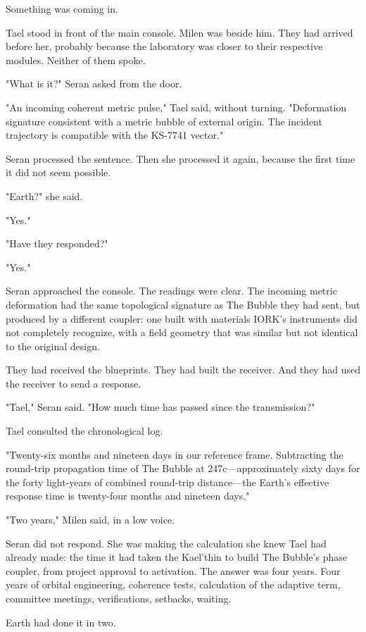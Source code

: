 \documentclass[11pt,a5paper,twoside]{book}
\begin{document}
Something was coming in.

Tael stood in front of the main console. Milen was beside him. They had arrived before her, probably because the laboratory was closer to their respective modules. Neither of them spoke.

"What is it?" Seran asked from the door.

"An incoming coherent metric pulse," Tael said, without turning. "Deformation signature consistent with a metric bubble of external origin. The incident trajectory is compatible with the KS-7741 vector."

Seran processed the sentence. Then she processed it again, because the first time it did not seem possible.

"Earth?" she said.

"Yes."

"Have they responded?"

"Yes."

Seran approached the console. The readings were clear. The incoming metric deformation had the same topological signature as The Bubble they had sent, but produced by a different coupler: one built with materials IORK's instruments did not completely recognize, with a field geometry that was similar but not identical to the original design.

They had received the blueprints. They had built the receiver. And they had used the receiver to send a response.

"Tael," Seran said. "How much time has passed since the transmission?"

Tael consulted the chronological log.

"Twenty-six months and nineteen days in our reference frame. Subtracting the round-trip propagation time of The Bubble at 247c—approximately sixty days for the forty light-years of combined round-trip distance—the Earth's effective response time is twenty-four months and nineteen days."

"Two years," Milen said, in a low voice.

Seran did not respond. She was making the calculation she knew Tael had already made: the time it had taken the Kael'thin to build The Bubble's phase coupler, from project approval to activation. The answer was four years. Four years of orbital engineering, coherence tests, calculation of the adaptive term, committee meetings, verifications, setbacks, waiting.

Earth had done it in two.
\end{document}
